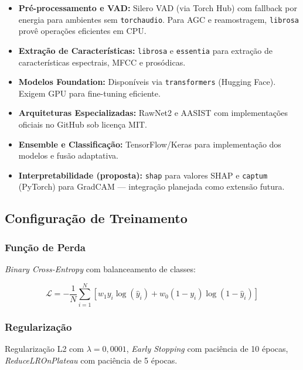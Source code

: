 \documentclass[12pt,a4paper]{article}
\begin{document}
\begin{itemize}
    \item \textbf{Pr\'{e}-processamento e VAD:} Silero VAD (via Torch Hub) com
    fallback por energia para ambientes sem \texttt{torchaudio}. Para AGC e
    reamostragem, \texttt{librosa} prov\^{e} opera\c{c}\~{o}es eficientes em
    CPU.
    \item \textbf{Extra\c{c}\~{a}o de Caracter\'{i}sticas:} \texttt{librosa}
    e \texttt{essentia} para extra\c{c}\~{a}o de caracter\'{i}sticas espectrais,
    MFCC e pros\'{o}dicas.
    \item \textbf{Modelos Foundation:} Dispon\'{i}veis via
    \texttt{transformers} (Hugging Face). Exigem GPU para fine-tuning
    eficiente.
    \item \textbf{Arquiteturas Especializadas:} RawNet2 e AASIST com
    implementa\c{c}\~{o}es oficiais no GitHub sob licen\c{c}a MIT.
    \item \textbf{Ensemble e Classifica\c{c}\~{a}o:} TensorFlow/Keras para
    implementa\c{c}\~{a}o dos modelos e fus\~{a}o adaptativa.
    \item \textbf{Interpretabilidade (proposta):} \texttt{shap} para valores
    SHAP e \texttt{captum} (PyTorch) para GradCAM --- integra\c{c}\~{a}o
    planejada como extens\~{a}o futura.
\end{itemize}

\subsection{Configura\c{c}\~{a}o de Treinamento}

\subsubsection{Fun\c{c}\~{a}o de Perda}

\textit{Binary Cross-Entropy} com balanceamento de classes:

\begin{equation}
\mathcal{L} = -\frac{1}{N}\sum_{i=1}^{N}\left[
w_1 y_i\log(\hat{y}_i) + w_0(1-y_i)\log(1-\hat{y}_i)\right]
\end{equation}

\subsubsection{Regulariza\c{c}\~{a}o}

Regulariza\c{c}\~{a}o L2 com $\lambda=0{,}0001$, \textit{Early Stopping}
com paci\^{e}ncia de 10 \'{e}pocas, \textit{ReduceLROnPlateau} com
paci\^{e}ncia de 5 \'{e}pocas.
\end{document}
